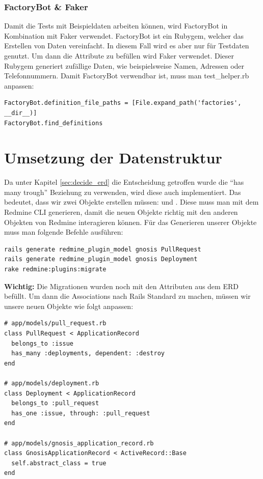 \subsubsection{FactoryBot \& Faker}
Damit die Tests mit Beispieldaten arbeiten können, wird FactoryBot in Kombination mit Faker verwendet. FactoryBot ist ein
Rubygem, welcher das Erstellen von Daten vereinfacht. In diesem Fall wird es aber nur für Testdaten genutzt. Um dann die
Attribute zu befüllen wird Faker verwendet. Dieser Rubygem generiert zufällige Daten, wie beispielsweise Namen, Adressen
oder Telefonnummern. \newline
Damit FactoryBot verwendbar ist, muss man test\_helper.rb anpassen:
\begin{codebox}[]
  \begin{verbatim}
FactoryBot.definition_file_paths = [File.expand_path('factories', __dir__)]
FactoryBot.find_definitions
  \end{verbatim}
\end{codebox}

\section{Umsetzung der Datenstruktur}
Da unter Kapitel \ref{sec:decide_erd} die Entscheidung getroffen wurde die \enquote{has many trough} Beziehung zu
verwenden, wird diese auch implementiert. Das bedeutet, dass wir zwei Objekte erstellen müssen: 
 und . Diese muss man mit dem Redmine CLI generieren,
damit die neuen Objekte richtig mit den anderen Objekten von Redmine interagieren können. Für das Generieren unserer
Objekte muss man folgende Befehle ausführen:
\begin{codebox}[]
  \begin{verbatim}
rails generate redmine_plugin_model gnosis PullRequest 
rails generate redmine_plugin_model gnosis Deployment
rake redmine:plugins:migrate
  \end{verbatim}
\end{codebox}
\textbf{Wichtig:} Die Migrationen wurden noch mit den Attributen aus dem ERD befüllt. \newline
Um dann die Associations nach Rails Standard zu machen, müssen wir unsere neuen Objekte wie folgt anpassen:
\begin{codebox}[]
  \begin{verbatim}
# app/models/pull_request.rb
class PullRequest < ApplicationRecord
  belongs_to :issue
  has_many :deployments, dependent: :destroy
end

# app/models/deployment.rb
class Deployment < ApplicationRecord
  belongs_to :pull_request
  has_one :issue, through: :pull_request
end

# app/models/gnosis_application_record.rb
class GnosisApplicationRecord < ActiveRecord::Base
  self.abstract_class = true
end
  \end{verbatim}
\end{codebox}

